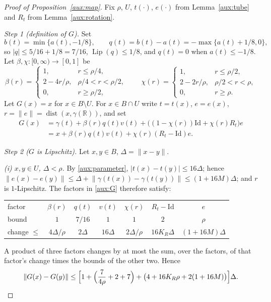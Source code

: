 \documentclass[11pt]{article}
\newcommand{\R}{\mathbb R}
\newcommand{\norm}[1]{\lVert #1\rVert}
\DeclareMathOperator{\Lip}{Lip}
\DeclareMathOperator{\dist}{dist}
\theoremstyle{definition}
\numberwithin{equation}{section}
\begin{document}
\begin{proof}[Proof of Proposition~\ref{aux:map}]
Fix $\rho$, $U$, $t(\cdot)$, $e(\cdot)$ from Lemma~\ref{aux:tube} and
$R_t$ from Lemma~\ref{aux:rotation}.

\emph{Step 1 (definition of $G$).} Set
\[
 b(t)=\min\{a(t),-1/8\},\qquad
 q(t)=b(t)-a(t)=-\max\{a(t)+1/8,0\},
\]
so $|q|\le5/16+1/8=7/16$, $\Lip(q)\le1/8$, and $q(t)=0$ when
$a(t)\le-1/8$. Let $\beta,\chi:[0,\infty)\to[0,1]$ be
\[
 \beta(r)=
 \begin{cases}
 1,&r\le\rho/4,\\
 2-4r/\rho,&\rho/4<r<\rho/2,\\
 0,&r\ge\rho/2,
 \end{cases}
 \qquad
 \chi(r)=
 \begin{cases}
 1,&r\le\rho/2,\\
 2-2r/\rho,&\rho/2<r<\rho,\\
 0,&r\ge\rho.
 \end{cases}
\]
Let $G(x)=x$ for $x\in B\setminus U$. For $x\in B\cap U$ write
$t=t(x)$, $e=e(x)$, $r=\norm e=\dist(x,\gamma(\R))$, and set
\begin{equation}\label{aux:G}
 \begin{split}
 G(x)&=\gamma(t)+\beta(r)q(t)v(t)
       +\bigl((1-\chi(r))\mathrm{Id}+\chi(r)R_t\bigr)e\\
 &=x+\beta(r)q(t)v(t)+\chi(r)(R_t-\mathrm{Id})e.
 \end{split}
\end{equation}

\emph{Step 2 ($G$ is Lipschitz).} Let $x,y\in B$, $\Delta=\norm{x-y}$.

\emph{(i) $x,y\in U$, $\Delta<\rho$.} By \eqref{aux:parameter},
$|t(x)-t(y)|\le16\Delta$; hence
$\norm{e(x)-e(y)}\le\Delta+\norm{\gamma(t(x))-\gamma(t(y))}
\le(1+16M)\Delta$; and $r$ is $1$-Lipschitz. The factors in
\eqref{aux:G} therefore satisfy:
\begin{center}
\begin{tabular}{lcccccc}
factor & $\beta(r)$ & $q(t)$ & $v(t)$ & $\chi(r)$ & $R_t-\mathrm{Id}$ & $e$\\
bound & $1$ & $7/16$ & $1$ & $1$ & $2$ & $\rho$\\
change $\le$ & $4\Delta/\rho$ & $2\Delta$ & $16\Delta$ & $2\Delta/\rho$ & $16K_R\Delta$ & $(1+16M)\Delta$
\end{tabular}
\end{center}
A product of three factors changes by at most the sum, over the
factors, of that factor's change times the bounds of the other two.
Hence
\[
 \norm{G(x)-G(y)}\le\Bigl[1+\Bigl(\frac7{4\rho}+2+7\Bigr)
   +\bigl(4+16K_R\rho+2(1+16M)\bigr)\Bigr]\Delta .
\]


\end{proof}
\end{document}
